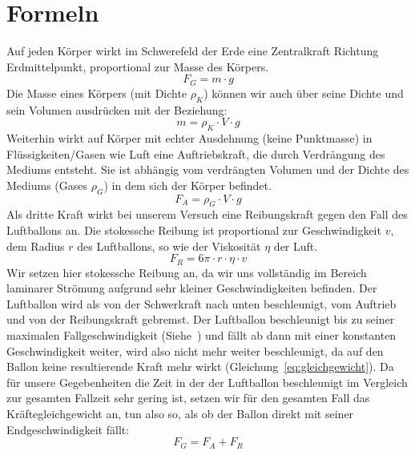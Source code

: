 \documentclass{article}
\begin{document}
    \section{Formeln}
    Auf jeden Körper wirkt im Schwerefeld der Erde eine Zentralkraft Richtung Erdmittelpunkt, proportional zur Masse des Körpers.
    \begin{equation} \label{eq:schwerkraft}
        F_G = m \cdot g    
    \end{equation}
    Die Masse eines Körpers (mit Dichte \(\rho_K\)) können wir auch über seine Dichte und sein Volumen ausdrücken mit der Beziehung:
    \begin{equation} \label{eq:masse_dichte_rel}
        m = \rho_K \cdot V \cdot g
    \end{equation}
    Weiterhin wirkt auf Körper mit echter Ausdehnung (keine Punktmasse) in Flüssigkeiten/Gasen wie Luft eine Auftriebskraft, 
    die durch Verdrängung des Mediums entsteht. Sie ist abhängig vom verdrängten Volumen und der Dichte des Mediums (Gases \(\rho_G\)) in dem sich der Körper befindet.
    \begin{equation} \label{eq:auftrieb}
        F_A = \rho_{G} \cdot V \cdot g
    \end{equation}
    Als dritte Kraft wirkt bei unserem Versuch eine Reibungskraft gegen den Fall des Luftballons an.
    Die stokessche Reibung ist proportional zur Geschwindigkeit \(v\), dem Radius \(r\) des Luftballons, so wie der Viskosität \( \eta \) der Luft.
    \begin{equation} \label{eq:stokes_reibung}
        F_R = 6 \pi \cdot r \cdot \eta \cdot v
    \end{equation}
    Wir setzen hier stokessche Reibung an, da wir uns vollständig im Bereich laminarer Strömung aufgrund sehr kleiner Geschwindigkeiten befinden.
    Der Luftballon wird als von der Schwerkraft nach unten beschleunigt, vom Auftrieb und von der Reibungskraft gebremst.
    Der Luftballon beschleunigt bis zu seiner maximalen Fallgeschwindigkeit (Siehe~\cite{Fall-Luftwiederstand}) und fällt ab dann mit einer konstanten Geschwindigkeit weiter,
    wird also nicht mehr weiter beschleunigt, da auf den Ballon keine resultierende Kraft mehr wirkt (Gleichung~\ref{eq:gleichgewicht}).
    Da für unsere Gegebenheiten die Zeit in der der Luftballon beschleunigt im Vergleich zur gesamten Fallzeit sehr gering ist,
    setzen wir für den gesamten Fall das Kräftegleichgewicht an, tun also so, als ob der Ballon direkt mit seiner Endgeschwindigkeit fällt:
    \begin{equation} \label{eq:gleichgewicht}
        F_G = F_A + F_R
    \end{equation}
\end{document}
